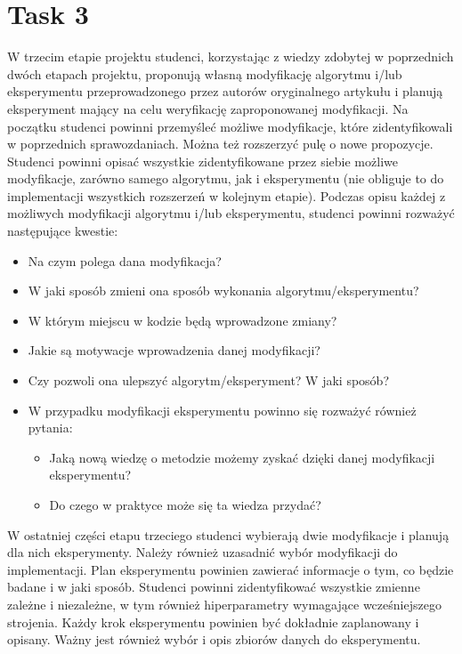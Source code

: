 \documentclass{article}
\begin{document}
\section{Task 3}
W trzecim etapie projektu studenci, korzystając z wiedzy zdobytej 
w poprzednich dwóch etapach projektu, proponują własną modyfikację algorytmu 
i/lub eksperymentu przeprowadzonego przez autorów oryginalnego artykułu i 
planują eksperyment mający na celu weryfikację zaproponowanej modyfikacji.
Na początku studenci powinni przemyśleć możliwe modyfikacje, które 
zidentyfikowali w poprzednich sprawozdaniach. Można też rozszerzyć pulę 
o nowe propozycje. Studenci powinni opisać wszystkie zidentyfikowane przez 
siebie możliwe modyfikacje, zarówno samego algorytmu, jak i eksperymentu (nie 
obliguje to do implementacji wszystkich rozszerzeń w kolejnym etapie).
Podczas opisu każdej z możliwych modyfikacji algorytmu i/lub 
eksperymentu, studenci powinni rozważyć następujące kwestie:
\begin{itemize}
    \item Na czym polega dana modyfikacja?
    \item W jaki sposób zmieni ona sposób wykonania algorytmu/eksperymentu?
    \item W którym miejscu w kodzie będą wprowadzone zmiany?
    \item Jakie są motywacje wprowadzenia danej modyfikacji?
    \item Czy pozwoli ona ulepszyć algorytm/eksperyment? W jaki sposób?
    \item W przypadku modyfikacji eksperymentu powinno się rozważyć również pytania:
    \begin{itemize}
        \item Jaką nową wiedzę o metodzie możemy zyskać dzięki danej modyfikacji eksperymentu?
        \item Do czego w praktyce może się ta wiedza przydać?
    \end{itemize}
\end{itemize}
W ostatniej części etapu trzeciego studenci wybierają dwie modyfikacje i 
planują dla nich eksperymenty. Należy również uzasadnić wybór modyfikacji do 
implementacji.
Plan eksperymentu powinien zawierać informacje o tym, co będzie badane 
i w jaki sposób. Studenci powinni zidentyfikować wszystkie zmienne zależne i
niezależne, w tym również hiperparametry wymagające wcześniejszego 
strojenia. Każdy krok eksperymentu powinien być dokładnie zaplanowany i 
opisany. Ważny jest również wybór i opis zbiorów danych do eksperymentu.
\end{document}
